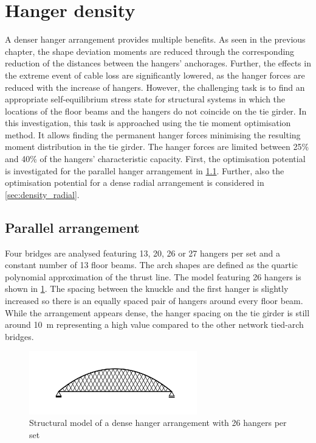 \newpage
\section{Hanger density} \label{sec:hanger_density}
A denser hanger arrangement provides multiple benefits. As seen in the previous chapter, the shape deviation moments are reduced through the corresponding reduction of the distances between the hangers' anchorages. Further, the effects in the extreme event of cable loss are significantly lowered, as the hanger forces are reduced with the increase of hangers. 
However, the challenging task is to find an appropriate self-equilibrium stress state for structural systems in which the locations of the floor beams and the hangers do not coincide on the tie girder. 
In this investigation, this task is approached using the tie moment optimisation method. It allows finding the permanent hanger forces minimising the resulting moment distribution in the tie girder. The hanger forces are limited between 25\% and 40\% of the hangers' characteristic capacity. First, the optimisation potential is investigated for the parallel hanger arrangement in \cref{sec:density_parallel}. Further, also the optimisation potential for a dense radial arrangement is considered in \cref{sec:density_radial}.

\subsection{Parallel arrangement} \label{sec:density_parallel}
Four bridges are analysed featuring 13, 20, 26 or 27 hangers per set and a constant number of 13 floor beams. The arch shapes are defined as the quartic polynomial approximation of the thrust line. The model featuring 26 hangers is shown in \cref{fig:structure_26}. The spacing between the knuckle and the first hanger is slightly increased so there is an equally spaced pair of hangers around every floor beam. While the arrangement appears dense, the hanger spacing on the tie girder is still around \SI{10}{m} representing a high value compared to the other network tied-arch bridges.

\begin{figure}[H]
    \centering
    \includegraphics[trim={0 1cm 0 1cm},clip, width=0.65\textwidth]{calculations/hanger density/structure_26.png}
    \caption{Structural model of a dense hanger arrangement with 26 hangers per set}
    \label{fig:structure_26}
\end{figure}

